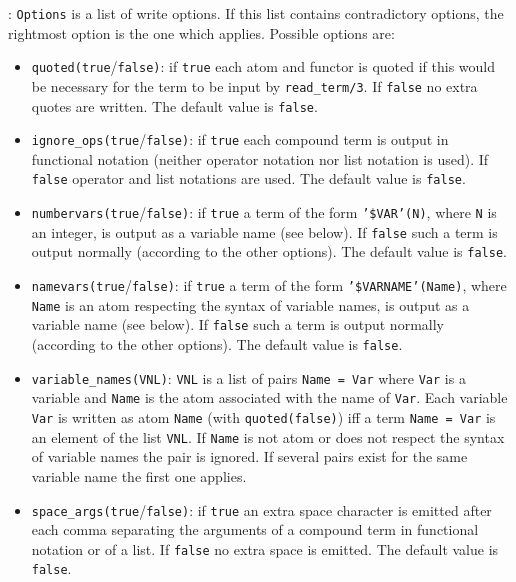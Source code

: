 : \texttt{Options} is a list of write options. If this
list contains contradictory options, the rightmost option is the one which
applies. Possible options are:

\begin{itemize}

\item {}\texttt{quoted(true}/\texttt{false)}: if \texttt{true} each
atom and functor is quoted if this would be necessary for the term to be
input by \texttt{read\_term/3}. If \texttt{false} no extra quotes are
written. The default value is \texttt{false}.

\item {}\texttt{ignore\_ops(true}/\texttt{false)}: if
\texttt{true} each compound term is output in functional notation (neither
operator notation nor list notation is used). If \texttt{false} operator and
list notations are used. The default value is \texttt{false}.

\item {}\texttt{numbervars(true}/\texttt{false)}: if
\texttt{true} a term of the form \texttt{'\$VAR'(N)}, where \texttt{N} is an
integer, is output as a variable name (see below). If \texttt{false}
such a term is output normally (according to the other options). The
default value is \texttt{false}.

\item {}\texttt{namevars(true}/\texttt{false)}: if \texttt{true} a
term of the form \texttt{'\$VARNAME'(Name)}, where \texttt{Name} is an atom 
respecting the syntax of variable names, is output as a variable name (see
below). If \texttt{false} such a term is output normally (according to the
other options). The default value is \texttt{false}.

\item {}\texttt{variable\_names(VNL)}: \texttt{VNL} is
a list of pairs \texttt{Name = Var} where \texttt{Var} is a
variable and \texttt{Name} is the atom associated with the
name of \texttt{Var}. Each variable \texttt{Var} is written as atom
\texttt{Name} (with \texttt{quoted(false)}) iff a term 
\texttt{Name = Var} is an element of the list \texttt{VNL}. If \texttt{Name}
is not atom or does not respect the syntax of variable names the pair is
ignored. If several pairs exist for the same variable name the first one applies.

\item {}\texttt{space\_args(true}/\texttt{false)}: if
\texttt{true} an extra space character is emitted after each comma
separating the arguments of a compound term in functional notation or of a
list. If \texttt{false} no extra space is emitted. The default value is
\texttt{false}.


\end{itemize}
